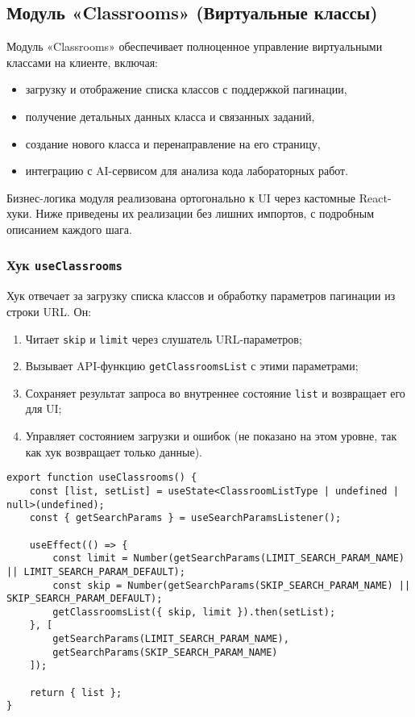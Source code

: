 \subsection{Модуль «Classrooms» (Виртуальные классы)}
Модуль «Classrooms» обеспечивает полноценное управление виртуальными классами на клиенте, включая:
\begin{itemize}
  \item загрузку и отображение списка классов с поддержкой пагинации,
  \item получение детальных данных класса и связанных заданий,
  \item создание нового класса и перенаправление на его страницу,
  \item интеграцию с AI-сервисом для анализа кода лабораторных работ.
\end{itemize}
Бизнес-логика модуля реализована ортогонально к UI через кастомные React-хуки. Ниже приведены их реализации без лишних импортов, с подробным описанием каждого шага.

\subsubsection{Хук \texttt{useClassrooms}}
Хук отвечает за загрузку списка классов и обработку параметров пагинации из строки URL. Он:
\begin{enumerate}
  \item Читает \texttt{skip} и \texttt{limit} через слушатель URL-параметров;
  \item Вызывает API-функцию \texttt{getClassroomsList} с этими параметрами;
  \item Сохраняет результат запроса во внутреннее состояние \texttt{list} и возвращает его для UI;
  \item Управляет состоянием загрузки и ошибок (не показано на этом уровне, так как хук возвращает только данные).
\end{enumerate}
\begin{lstlisting}[caption={Кастомный хук useClassrooms}, label={lst:useClassrooms}]
export function useClassrooms() {
    const [list, setList] = useState<ClassroomListType | undefined | null>(undefined);
    const { getSearchParams } = useSearchParamsListener();

    useEffect(() => {
        const limit = Number(getSearchParams(LIMIT_SEARCH_PARAM_NAME) || LIMIT_SEARCH_PARAM_DEFAULT);
        const skip = Number(getSearchParams(SKIP_SEARCH_PARAM_NAME) || SKIP_SEARCH_PARAM_DEFAULT);
        getClassroomsList({ skip, limit }).then(setList);
    }, [
        getSearchParams(LIMIT_SEARCH_PARAM_NAME),
        getSearchParams(SKIP_SEARCH_PARAM_NAME)
    ]);

    return { list };
}
\end{lstlisting}

